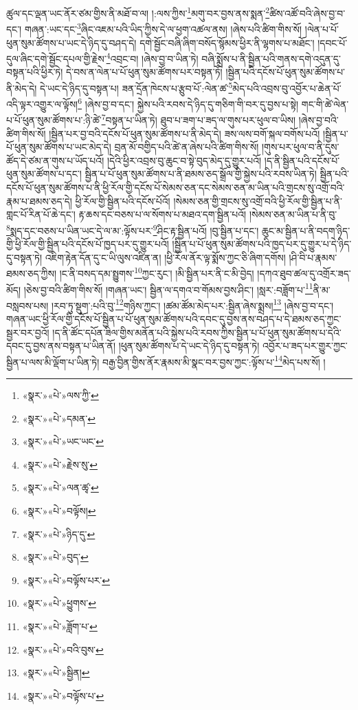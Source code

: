 ཚུལ་དང་ལྡན་ཡང་ནོར་ཙམ་གྱིས་ནི་མཐོ་བ་ལ། །:ལས་ཀྱིས་\footnote{«སྣར་»«པེ་»ལས་ཀྱི་}མགུ་བར་བྱས་ནས་སྨན་\footnote{«སྣར་»«པེ་»དམན་}ཚིས་འཚོ་བའི་ཞེས་བྱ་བ་དང་། གཞན་:ཡང་དང་\footnote{«སྣར་»«པེ་»ཡང་ཡང་}ཞིང་འཇམ་པའི་ཡིད་ཀྱིས་དེ་ལ་ཕྱག་འཚལ་ནས། །ཞེས་པའི་ཚིག་གིས་སོ། །ལེན་པ་པོ་ཕུན་སུམ་ཚོགས་པ་ཡང་དེ་ཉིད་དུ་བཤད་དེ། དགེ་སྦྱོང་བཞི་ཞིག་བསོད་སྙོམས་ཕྱིར་ནི་ལྷགས་པ་མཐོང་། །དབང་པོ་དུལ་ཞིང་དགེ་སྦྱོང་དཔལ་གྱི་རྗེས་\footnote{«སྣར་»«པེ་»རྗེས་སུ་}འབྲང་བ། །ཞེས་བྱ་བ་ཡིན་ཏེ། བཞི་སྨྲོས་པ་ནི་སྦྱིན་པའི་གནས་དགེ་འདུན་དུ་བསྟན་པའི་ཕྱིར་ཏེ། དེ་བས་ན་ལེན་པ་པོ་ཕུན་སུམ་ཚོགས་པར་བསྟན་ཏོ། །སྦྱིན་པའི་དངོས་པོ་ཕུན་སུམ་ཚོགས་པ་ནི་མེད་དེ། དེ་ཡང་དེ་ཉིད་དུ་བསྟན་པ། ཟན་དྲོན་ཁེངས་པ་རྩུབ་པོ་:ལེན་ཚ་\footnote{«སྣར་»«པེ་»ལན་ཚྭ་}མེད་པའི་འབྲས་བུ་འབྱོར་པ་ཆེན་པོ་འདི་ལྟར་འགྱུར་ལ་ལྟོས།\footnote{«སྣར་»«པེ་»བལྟོས།} །ཞེས་བྱ་བ་དང་། སྐྱེས་པའི་རབས་དེ་ཉིད་དུ་གཅིག་གི་བར་དུ་བྱས་པ་སྟེ། གང་གི་ཚེ་ལེན་པ་པོ་ཕུན་སུམ་ཚོགས་པ་:ཉི་ཚེ་\footnote{«སྣར་»«པེ་»ཉིད་དུ་}བསྟན་པ་ཡིན་ཏེ། ཐུབ་པ་ཟག་པ་ཟད་ལ་གུས་པར་ཕུལ་བ་ཡིས། །ཞེས་བྱ་བའི་ཚིག་གིས་སོ། །སྦྱིན་པར་བྱ་བའི་དངོས་པོ་ཕུན་སུམ་ཚོགས་པ་ནི་མེད་དེ། ཟས་ལས་བགོ་སྐལ་བགོས་པའོ། །སྦྱིན་པ་པོ་ཕུན་སུམ་ཚོགས་པ་ཡང་མེད་དེ། བྲན་མོ་བགྱིད་པའི་ཚེ་ན་ཞེས་པའི་ཚིག་གིས་སོ། །གུས་པར་ཕུལ་བ་ནི་དུས་ཚོད་དེ་ཙམ་ན་གུས་པ་ཡོད་པའོ། །དེའི་ཕྱིར་འབྲས་བུ་ཆུང་བ་སྟེ་བུད་མེད་དུ་གྱུར་པའོ། །ད་ནི་སྦྱིན་པའི་དངོས་པོ་ཕུན་སུམ་ཚོགས་པ་དང་། སྦྱིན་པ་པོ་ཕུན་སུམ་ཚོགས་པ་ནི་ཐམས་ཅད་སྒྲོལ་གྱི་སྐྱེས་པའི་རབས་ཡིན་ཏེ། སྦྱིན་པའི་དངོས་པོ་ཕུན་སུམ་ཚོགས་པ་ནི་ཕྱི་རོལ་གྱི་དངོས་པོ་སེམས་ཅན་དང་སེམས་ཅན་མ་ཡིན་པའི་གྲངས་སུ་འགྲོ་བའི་རྣམ་པ་ཐམས་ཅད་དེ། ཕྱི་རོལ་གྱི་སྦྱིན་པའི་དངོས་པོའོ། །སེམས་ཅན་གྱི་གྲངས་སུ་འགྲོ་བའི་ཕྱི་རོལ་གྱི་སྦྱིན་པ་ནི་གླང་པོ་རིན་པོ་ཆེ་དང་། རྟ་ཆས་དང་བཅས་པ་ལ་སོགས་པ་མཐའ་དག་སྦྱིན་པའོ། །སེམས་ཅན་མ་ཡིན་པ་ནི་བུ་\footnote{«སྣར་»«པེ་»བུད་}སྨད་དང་བཅས་པ་ཡིན་ཡང་དེ་ལ་མ་:ལྟོས་པར་\footnote{«སྣར་»«པེ་»བལྟོས་པར་}ཤིང་རྟ་སྦྱིན་པའོ། །བུ་སྦྱིན་པ་དང་། ཆུང་མ་སྦྱིན་པ་ནི་བདག་ཉིད་གྱི་ཕྱི་རོལ་གྱི་སྦྱིན་པའི་དངོས་པོ་ཁྱད་པར་དུ་གྱུར་པའོ། །སྦྱིན་པ་པོ་ཕུན་སུམ་ཚོགས་པའི་ཁྱད་པར་དུ་གྱུར་པ་དེ་ཉིད་དུ་བསྟན་ཏེ། འཇིག་རྟེན་དོན་དུ་ང་ཡི་ལུས་འཛིན་ན། །ཕྱི་རོལ་ནོར་ལྟ་སྨོས་ཀྱང་ཅི་ཞིག་དགོས། །ཤི་བི་པ་རྣམས་ཐམས་ཅད་ཀྱིས། །ང་ནི་བསད་དམ་སྤྱུགས་\footnote{«སྣར་»«པེ་»ཕྱུགས་}ཀྱང་རུང་། །མི་སྦྱིན་པར་ནི་ང་མི་བྱེད། །དཀའ་ཐུབ་ཚལ་དུ་འགྲོར་ཟད་མོད། །ཅེས་བྱ་བའི་ཚིག་གིས་སོ། །གཞན་ཡང་། སྦྱིན་ལ་དགའ་བ་གོམས་བྱས་ཤིང་། །སླར་:བཟློག་པ་\footnote{«སྣར་»«པེ་»ཟློག་པ་}ནི་མ་བསླབས་པས། །རབ་ཏུ་སྡུག་:པའི་བུ་\footnote{«སྣར་»«པེ་»བའི་བུས་}གཉིས་ཀྱང་། །ཚམ་ཚོམ་མེད་པར་:སྦྱིན་ཞེས་སྨྲས།\footnote{«སྣར་»«པེ་»སྦྱིན།} །ཞེས་བྱ་བ་དང་། གཞན་ཡང་ཕྱི་རོལ་གྱི་དངོས་པོ་སྦྱིན་པ་པོ་ཕུན་སུམ་ཚོགས་པའི་དབང་དུ་བྱས་ནས་བཤད་པ་དེ་ཐམས་ཅད་ཀྱང་སྦྱར་བར་བྱའོ། །ད་ནི་ཚོང་དཔོན་ཟིལ་གྱིས་མནོན་པའི་སྐྱེས་པའི་རབས་ཀྱིས་སྦྱིན་པ་པོ་ཕུན་སུམ་ཚོགས་པ་དེའི་དབང་དུ་བྱས་ནས་བསྟན་པ་ཡིན་ནོ། །ཕུན་སུམ་ཚོགས་པ་དེ་ཡང་དེ་ཉིད་དུ་བསྟན་ཏེ། འབྱོར་པ་ཟད་པར་གྱུར་ཀྱང་སྦྱིན་པ་ལས་མི་ལྡོག་པ་ཡིན་ཏེ། བརྒྱ་བྱིན་གྱིས་ནོར་རྣམས་མི་སྣང་བར་བྱས་ཀྱང་:ལྟོས་པ་\footnote{«སྣར་»«པེ་»བལྟོས་པ་}མེད་པས་སོ། །

